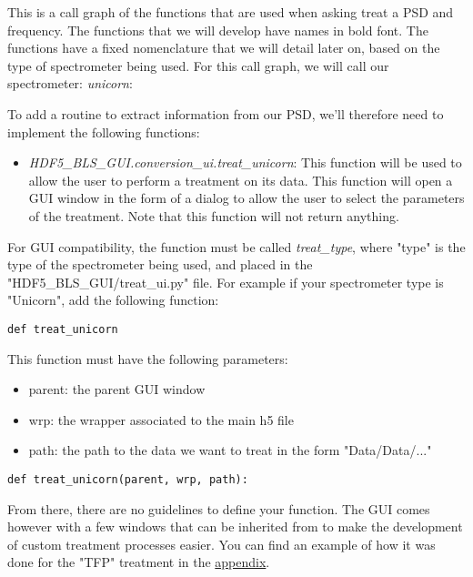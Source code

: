 This is a call graph of the functions that are used when asking treat a PSD and frequency. The functions that we will develop have names in bold font. The functions have a fixed nomenclature that we will detail later on, based on the type of spectrometer being used. For this call graph, we will call our spectrometer: \textit{unicorn}:

\begin{center}
\end{center}

To add a routine to extract information from our PSD, we'll therefore need to implement the following functions:

\begin{itemize}
    \item \textit{HDF5\_BLS\_GUI.conversion\_ui.treat\_unicorn}: This function will be used to allow the user to perform a treatment on its data. This function will open a GUI window in the form of a dialog to allow the user to select the parameters of the treatment. Note that this function will not return anything.
\end{itemize}


For GUI compatibility, the function must be called \textit{treat\_type}, where "type" is the type of the spectrometer being used, and placed in the "HDF5\_BLS\_GUI/treat\_ui.py" file. For example if your spectrometer type is "Unicorn", add the following function:
\begin{lstlisting}
def treat_unicorn
\end{lstlisting}

This function must have the following parameters:
    \begin{itemize}
        \item parent: the parent GUI window
        \item wrp: the wrapper associated to the main h5 file
        \item path: the path to the data we want to treat in the form "Data/Data/..."
    \end{itemize}
\begin{lstlisting}
def treat_unicorn(parent, wrp, path):
\end{lstlisting}

From there, there are no guidelines to define your function. The GUI comes however with a few windows that can be inherited from to make the development of custom treatment processes easier. You can find an example of how it was done for the "TFP" treatment in the \hyperref[subsec:example_treatment.TFP]{appendix}.